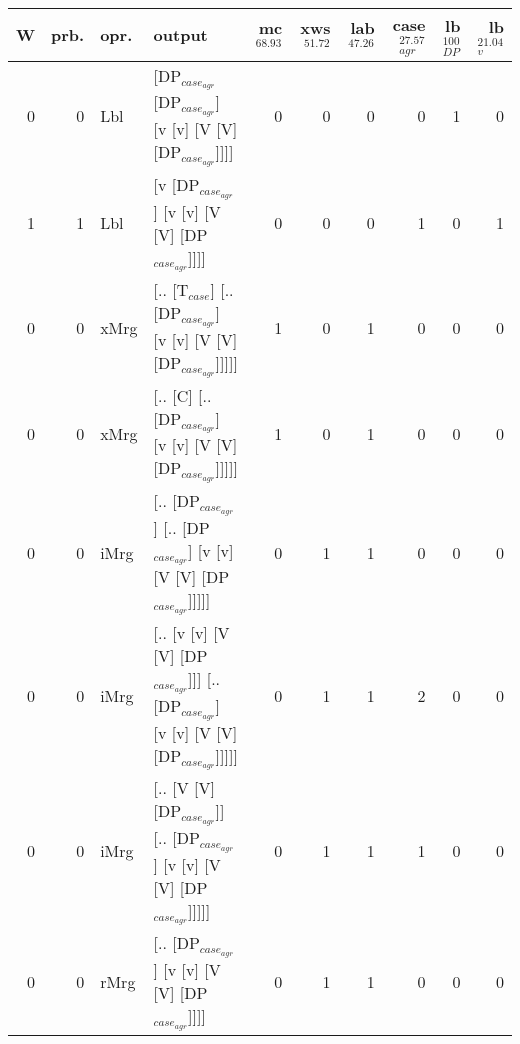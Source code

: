 \begin{tabularx}{\linewidth}{rrlXrrrrrr}
\hline
   W &   prb. & opr.   & output                                                                              &   mc$^{68.93}$ &   xws$^{51.72}$ &   lab$^{47.26}$ &   case$_{agr}^{27.57}$ &   lb$_{DP}^{100}$ &   lb$_{v}^{21.04}$ \\
\hline
   0 &   0 & Lbl  & [DP$_{case_{agr}}$ [DP$_{case_{agr}}$] [v [v] [V [V] [DP$_{case_{agr}}$]]]]                           &            0 &             0 &             0 &                  0 &                1 &              0 \\
   1 &   1 & Lbl  & [v [DP$_{case_{agr}}$] [v [v] [V [V] [DP$_{case_{agr}}$]]]]                                     &            0 &             0 &             0 &                  1 &                0 &              1 \\
   0 &   0 & xMrg & [.. [T$_{case}$] [.. [DP$_{case_{agr}}$] [v [v] [V [V] [DP$_{case_{agr}}$]]]]]                      &            1 &             0 &             1 &                  0 &                0 &              0 \\
   0 &   0 & xMrg & [.. [C] [.. [DP$_{case_{agr}}$] [v [v] [V [V] [DP$_{case_{agr}}$]]]]]                           &            1 &             0 &             1 &                  0 &                0 &              0 \\
   0 &   0 & iMrg & [.. [DP$_{case_{agr}}$] [.. [DP$_{case_{agr}}$] [v [v] [V [V] [DP$_{case_{agr}}$]]]]]                 &            0 &             1 &             1 &                  0 &                0 &              0 \\
   0 &   0 & iMrg & [.. [v [v] [V [V] [DP$_{case_{agr}}$]]] [.. [DP$_{case_{agr}}$] [v [v] [V [V] [DP$_{case_{agr}}$]]]]] &            0 &             1 &             1 &                  2 &                0 &              0 \\
   0 &   0 & iMrg & [.. [V [V] [DP$_{case_{agr}}$]] [.. [DP$_{case_{agr}}$] [v [v] [V [V] [DP$_{case_{agr}}$]]]]]         &            0 &             1 &             1 &                  1 &                0 &              0 \\
   0 &   0 & rMrg & [.. [DP$_{case_{agr}}$] [v [v] [V [V] [DP$_{case_{agr}}$]]]]                                    &            0 &             1 &             1 &                  0 &                0 &              0 \\
\hline
\end{tabularx}\endgroup\\
